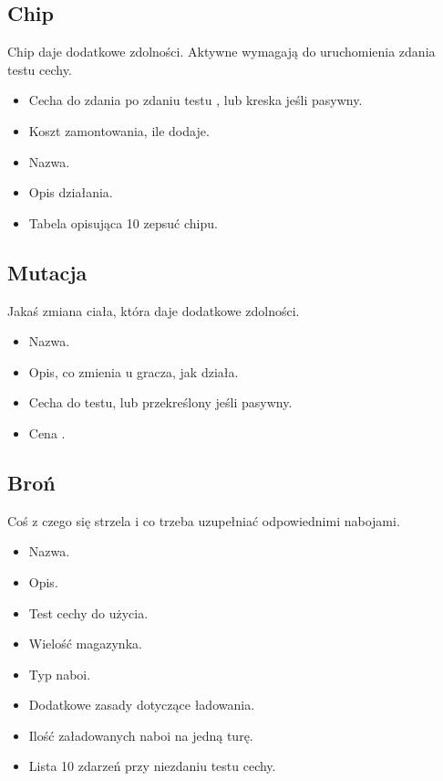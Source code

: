 \subsection{Chip}
Chip daje dodatkowe zdolności.
Aktywne wymagają do uruchomienia zdania testu cechy.
\begin{itemize}
 \item Cecha do zdania po zdaniu testu \abnkp{}, lub kreska jeśli pasywny.
 \item Koszt zamontowania, ile \abnkp{} dodaje.
 \item Nazwa.
 \item Opis działania.
 \item Tabela opisująca 10 zepsuć chipu.
\end{itemize}

\subsection{Mutacja}
Jakaś zmiana ciała, która daje dodatkowe zdolności.
\begin{itemize}
 \item Nazwa.
 \item Opis, co zmienia u gracza, jak działa.
 \item Cecha do testu, lub przekreślony jeśli pasywny.
 \item Cena \abnkp{}. 
\end{itemize}

\subsection{Broń}
Coś z czego się strzela i co trzeba uzupełniać odpowiednimi nabojami.
\begin{itemize}
 \item Nazwa.
 \item Opis.
 \item Test cechy do użycia.
 \item Wielość magazynka.
 \item Typ naboi.
 \item Dodatkowe zasady dotyczące ładowania.
 \item Ilość załadowanych naboi na jedną turę.
 \item Lista 10 zdarzeń przy niezdaniu testu cechy.
\end{itemize}











